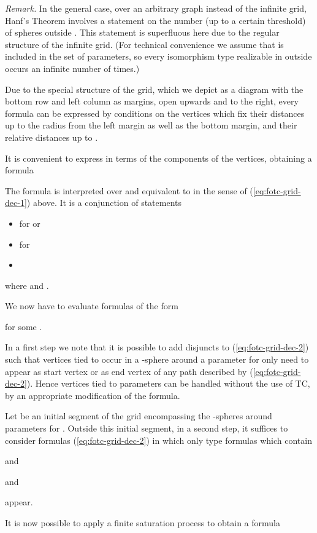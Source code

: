 \documentclass{LMCS}
\begin{document}
{\emph{Remark.} In the general case, over an arbitrary graph instead of the 
infinite grid, Hanf's Theorem involves a statement on the number (up to a certain 
threshold) of spheres outside . This 
statement is superfluous here due to the regular structure of the infinite grid.
(For technical convenience we assume that  is included in the set of 
parameters, so every isomorphism type realizable in  outside 
 occurs an infinite number of times.)

Due to the special structure of the grid, which we depict as a diagram 
with the bottom row and left column as margins, open upwards and 
to the right, every formula 
 can be expressed by conditions on the vertices
 which fix their distances up to the radius  from the
left margin as well as the bottom margin, and their relative distances up to .

It is convenient to express  in terms of the 
components of the vertices, obtaining a formula 

The formula  is interpreted over  and equivalent to  in 
the sense of (\ref{eq:fotc-grid-dec-1}) above. It is a conjunction of statements

\begin{itemize}
\item  for  or 
\item  for 
\item 
\end{itemize}
where  and . 

We now have to evaluate formulas of the form 

for some .

In a first step we note that it is possible to add disjuncts to (\ref{eq:fotc-grid-dec-2})
such that vertices tied to occur in a -sphere around a parameter  for 
only need to appear as start vertex or as end vertex of any path described by (\ref{eq:fotc-grid-dec-2}).
Hence vertices tied to parameters can be handled without the use of TC, by an appropriate 
modification of the formula.

Let  be an initial segment of the grid encompassing the -spheres around parameters 
 for . Outside this initial segment, in a second step, it suffices to 
consider formulas (\ref{eq:fotc-grid-dec-2}) in which only type formulas 
which contain


and 
 
and
 
appear.

It is now possible to apply a finite saturation process to obtain a formula

}
\end{document}
